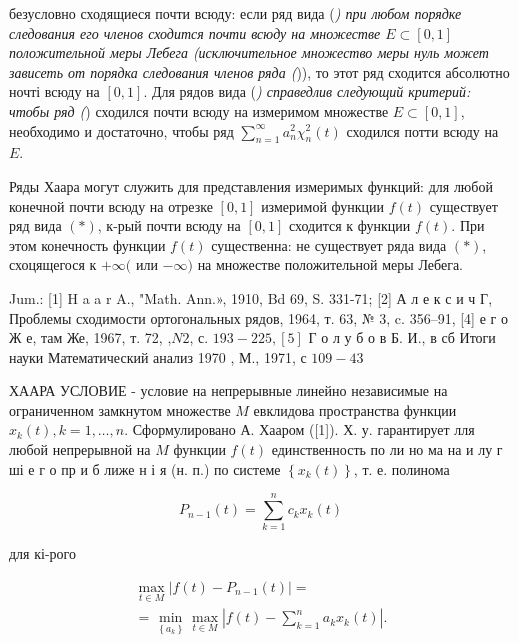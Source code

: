 \documentclass[10pt]{article}
\begin{document}
безусловно сходящиеся почти всюду: если ряд вида (\textit{) при любом порядке следования его членов сходится почти всюду на множестве $E \subset[0,1]$ положительной меры Лебега (исключительное множество меры нуль может зависеть от порядка следования членов ряда (})), то этот ряд сходится абсолютно ночті всюду на $[0,1]$. Для рядов вида (\textit{) справедлив следующий критерий: чтобы ряд (}) сходился почти всюду на измеримом множестве $E \subset[0,1]$, необходимо и достаточно, чтобы ряд $\sum_{n=1}^{\infty} a_{n}^{2} \chi_{n}^{2}(t)$ сходился потти всюду на $E$.



Ряды Хаара могут служить для представления измеримых функций: для любой конечной почти всюду на отрезке $[0,1]$ измеримой функции $f(t)$ существует ряд вида $(*)$, к-рый почти всюду на $[0,1]$ сходится к функции $f(t)$. При этом конечность функции $f(t)$ существенна: не существует ряда вида $(*)$, схоцящегося к $+\infty($ или $-\infty)$ на множестве положительной меры Лебега.



Jum.: [1] H a a r A., "Math. Ann.», 1910, Bd 69, S. 331-71; [2] А л е к с и ч Г, Проблемы сходимости ортогональных рядов, 1964, т. 63, № 3, c. 356--91, [4] е г о Ж е, там Же, 1967, т. 72, ,$N 2$, с. $193-225,[5]$ Г о л у б о в Б. И., в сб Итоги науки Математический анализ 1970 , М., 1971, с $109-43$



ХААРА УСЛОВИЕ - условие на непрерывные линейно независимые на ограниченном замкнутом множестве $M$ евклидова пространства функции $x_{k}(t), k=1, \ldots, n$. Сформулировано А. Хааром ([1]). Х. у. гарантирует лля любой непрерывной на $M$ функции $f(t)$ единственность по ли но ма на и лу г ші е г о пр и б лиже н і я (н. п.) по системе $\left\{x_{k}(t)\right\}$, т. е. полинома



\[

P_{n-1}(t)=\sum_{k=1}^{n} c_{k} x_{k}(t)

\]



для кі-рого



\[

\begin{gathered}

\max _{t \in M}\left|f(t)-P_{n-1}(t)\right|= \\

=\min _{\left\{a_{k}\right\}} \max _{t \in M}\left|f(t)-\sum_{k=1}^{n} a_{k} x_{k}(t)\right| .

\end{gathered}

\]
\end{document}
